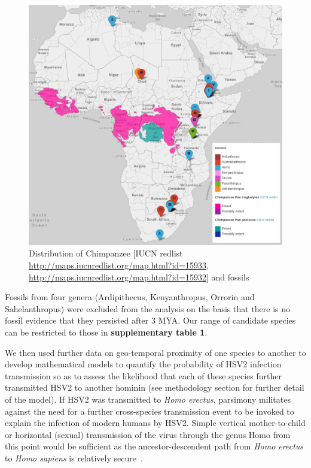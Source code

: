\documentclass[fleqn,10pt]{wlscirep}
\begin{document}
\begin{figure}
  \centering
  \includegraphics[width=\textwidth]{figs/chimpanzee}
  \caption{Distribution of Chimpanzee [IUCN redlist \url{http://maps.iucnredlist.org/map.html?id=15933}, \url{http://maps.iucnredlist.org/map.html?id=15932}] and fossils}
  \label{fig:chimpanzee}   
\end{figure}     

Fossils from four genera (Ardipithecus, Kenyanthropus, Orrorin and Sahelanthropus) were excluded from the analysis on the basis that there is no fossil evidence that they persisted after 3 MYA. Our range of candidate species can be restricted to those in \textbf{supplementary table 1}.

We then used further data on geo-temporal proximity of one species to another to develop mathematical models to quantify the probability of HSV2 infection transmission so as to assess the likelihood that each of these species further transmitted HSV2 to another hominin (see methodology section for further detail of the model). If HSV2 was transmitted to \textit{Homo erectus}, parsimony militates against the need for a further cross-species transmission event to be invoked to explain the infection of modern humans by HSV2. Simple vertical mother-to-child or horizontal (sexual) transmission of the virus through the genus Homo from this point would be sufficient as the ancestor-descendent path from \textit{Homo erectus} to \textit{Homo sapiens} is relatively secure~\cite{Maslin2015}.
\end{document}
